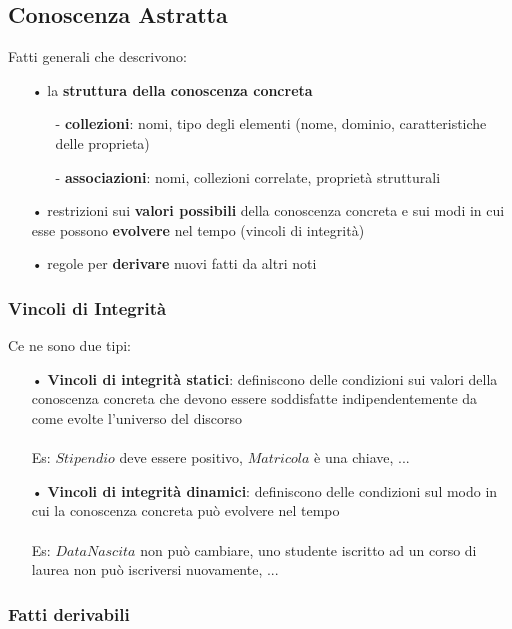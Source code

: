 \documentclass[12pt, letterpaper]{article}
\begin{document}
\subsection{Conoscenza Astratta}

Fatti generali che descrivono:

\begin{itemize}
   \item[•] la \textbf{struttura della conoscenza concreta}
      \begin{itemize}
         \item[-] \textbf{collezioni}: nomi, tipo degli elementi (nome, dominio, caratteristiche delle proprieta)
         \item[-] \textbf{associazioni}: nomi, collezioni correlate, proprietà strutturali 
      \end{itemize}
   \item[•] restrizioni sui \textbf{valori possibili} della conoscenza concreta e sui modi in cui esse 
      possono \textbf{evolvere} nel tempo (vincoli di integrità)
   \item[•] regole per \textbf{derivare} nuovi fatti da altri noti 
\end{itemize}

\subsubsection{Vincoli di Integrità}

Ce ne sono due tipi:

\begin{itemize}
   \item[•] \textbf{Vincoli di integrità statici}: definiscono delle condizioni sui valori della conoscenza concreta che devono essere soddisfatte 
      indipendentemente da come evolte l'universo del discorso 
      \\
      \\Es: $Stipendio$ deve essere positivo, $Matricola$ è una chiave, ...
   \item[•] \textbf{Vincoli di integrità dinamici}: definiscono delle condizioni sul modo in cui la 
      conoscenza concreta può evolvere nel tempo 
      \\
      \\Es: $DataNascita$ non può cambiare, uno studente iscritto ad un corso di laurea non può iscriversi nuovamente, ...
\end{itemize}

\subsubsection{Fatti derivabili}
\end{document}
